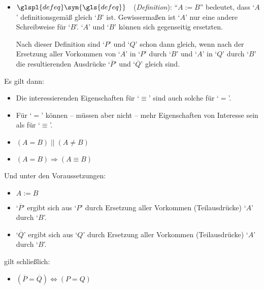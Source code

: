 \documentclass[english,ngerman,parskip=half,headsepline,footsepline,
	fleqn,notitlepage]{scrreprt}
\newcommand*{\metaoder}{||}%
\newcommand*{\metaor}{\;\metaoder\;}%
\newcommand*{\metaimp}{\Rightarrow}%
\newcommand*{\metaequiv}{\Leftrightarrow}%
\newcommand*{\defeq}{:=}%
\newcommand*{\charqt}[1]{\enquote*{#1}}%
\newcommand*{\strqt}[1]{\enquote{#1}}%
\newcommand*{\symqt}[1]{\charqt{#1}}%
\newcommand*{\forqt}[1]{\strqt{#1}}%
\newcommand*{\Idx}[1]{#1\idx{#1}}%
\newcommand*{\glsSym}[1]{\glspl{#1}\sym{\gls{#1}}}%
\begin{document}
\begin{itemize}
		\item $\glsSym{defeq}$~~(\emph{\Idx{Definition}}):
		\forqt{$A \defeq B$} bedeutet,
		dass \symqt{$A$} definitionsgemäß gleich \symqt{$B$} ist.
		Gewissermaßen ist \symqt{$A$}
		nur eine andere Schreibweise für \symqt{$B$}.
		\symqt{$A$} und \symqt{$B$} können sich gegenseitig ersetzten.

		Nach dieser Definition sind \symqt{$P$} und \symqt{$Q$}
		schon dann gleich,
		wenn nach der Ersetzung aller Vorkommen von
		\symqt{$A$} in \symqt{$P$} durch \symqt{$B$} und
		\symqt{$A$} in \symqt{$Q$} durch \symqt{$B$}
		die resultierenden Ausdrücke
		\symqt{$\overline{P}$} und \symqt{$\overline{Q}$} gleich sind.

	\end{itemize}

	Es gilt dann:
	\begin{itemize}

		\item Die interessierenden Eigenschaften für \symqt{$\equiv$}
		sind auch solche für \symqt{$=$}.

		\item Für \symqt{$=$} können
		-- müssen aber nicht --
		mehr Eigenschaften von Interesse sein als für \symqt{$\equiv$}.

		\item $(A = B) \metaor (A \ne B)$

		\item $(A = B) \metaimp (A \equiv B)$

	\end{itemize}

	Und unter den Voraussetzungen:
	\begin{itemize}

		\item $A \defeq B$

		\item \symqt{$\overline{P}$} ergibt sich aus \symqt{$P$} durch
		Ersetzung aller Vorkommen (Teilausdrücke) \symqt{$A$} durch \symqt{$B$}.

		\item \symqt{$\overline{Q}$} ergibt sich aus \symqt{$Q$} durch
		Ersetzung aller Vorkommen (Teilausdrücke) \symqt{$A$} durch \symqt{$B$}.

	\end{itemize}

	gilt schließlich:
	\begin{itemize}

		\item $(\overline{P} = \overline{Q}) \metaequiv (P = Q)$

	\end{itemize}
\end{document}
